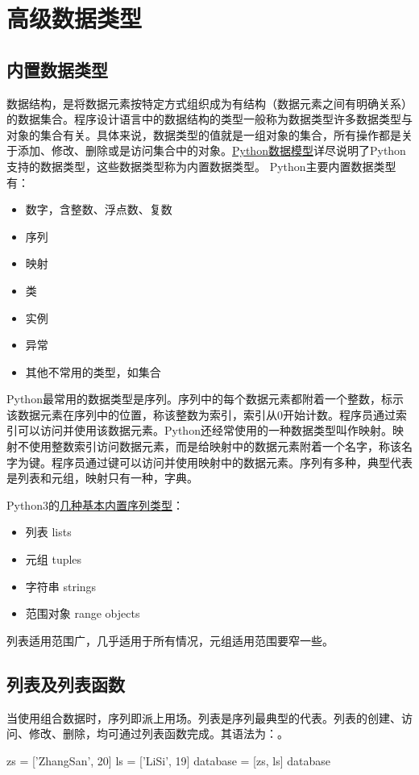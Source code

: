 \chapter{高级数据类型}

\section{内置数据类型}
数据结构，是将数据元素按特定方式组织成为有结构（数据元素之间有明确关系）的数据集合。程序设计语言中的数据结构的类型一般称为数据类型许多数据类型与对象的集合有关。具体来说，数据类型的值就是一组对象的集合，所有操作都是关于添加、修改、删除或是访问集合中的对象。\href{https://docs.python.org/3/reference/datamodel.html}{Python数据模型}详尽说明了Python支持的数据类型，这些数据类型称为内置数据类型。
Python主要内置数据类型有：
\begin{itemize}
\item 数字，含整数、浮点数、复数
\item 序列
\item 映射
\item 类
\item 实例
\item 异常
\item 其他不常用的类型，如集合
\end{itemize}

Python最常用的数据类型是序列。序列中的每个数据元素都附着一个整数，标示该数据元素在序列中的位置，称该整数为索引，索引从0开始计数。程序员通过索引可以访问并使用该数据元素。Python还经常使用的一种数据类型叫作映射。映射不使用整数索引访问数据元素，而是给映射中的数据元素附着一个名字，称该名字为键。程序员通过键可以访问并使用映射中的数据元素。序列有多种，典型代表是列表和元组，映射只有一种，字典。

Python3的\href{https://docs.python.org/3/library/stdtypes.html#sequence-types-list-tuple-range}{几种基本内置序列类型}：
\begin{itemize}
\item 列表 lists
\item 元组 tuples
\item 字符串 strings
\item 范围对象 range objects
\end{itemize}
列表适用范围广，几乎适用于所有情况，元组适用范围要窄一些。

\section{列表及列表函数}
当使用组合数据时，序列即派上用场。列表是序列最典型的代表。列表的创建、访问、修改、删除，均可通过列表函数完成。其语法为：。
\begin{python}
zs = ['ZhangSan', 20]
ls = ['LiSi', 19]
database = [zs, ls]
database
\end{python}
